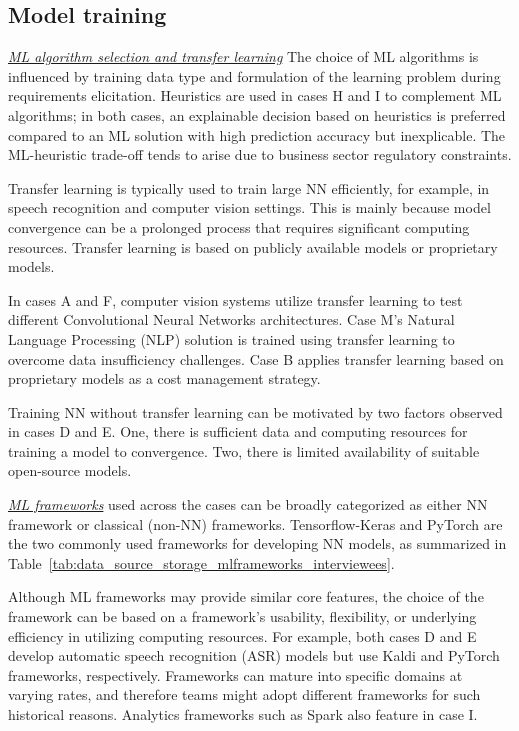 \subsection{Model training}

\underline{\emph{ML algorithm selection and transfer learning}}
The choice of ML algorithms is influenced by training data type and formulation of the learning problem during requirements elicitation. Heuristics are used in cases H and I to complement ML algorithms; in both cases, an explainable decision based on heuristics is preferred compared to an ML solution with high prediction accuracy but inexplicable. The ML-heuristic trade-off tends to arise due to business sector regulatory constraints.

Transfer learning is typically used to train large NN efficiently, for example, in speech recognition and computer vision settings. This is mainly because model convergence can be a prolonged process that requires significant computing resources. Transfer learning is based on publicly available models or proprietary models.

In cases A and F, computer vision systems utilize transfer learning to test different Convolutional Neural Networks architectures. Case M's Natural Language Processing (NLP) solution is trained using transfer learning to overcome data insufficiency challenges. Case B applies transfer learning based on proprietary models as a cost management strategy. 

Training NN without transfer learning can be motivated by two factors observed in cases D and E. One, there is sufficient data and computing resources for training a model to convergence. Two, there is limited availability of suitable open-source models.

\underline{\emph{ML frameworks}}
used across the cases can be broadly categorized as either NN framework or classical (non-NN) frameworks. Tensorflow-Keras and PyTorch are the two commonly used frameworks for developing NN models, as summarized in  Table~\ref{tab:data_source_storage_mlframeworks_interviewees}.

Although ML frameworks may provide similar core features, the choice of the framework can be based on a framework's usability, flexibility, or underlying efficiency in utilizing computing resources. For example, both cases D and E develop automatic speech recognition (ASR) models but use Kaldi and PyTorch frameworks, respectively. 
Frameworks can mature into specific domains at varying rates, and therefore teams might adopt different frameworks for such historical reasons. Analytics frameworks such as Spark also feature in case I. 

